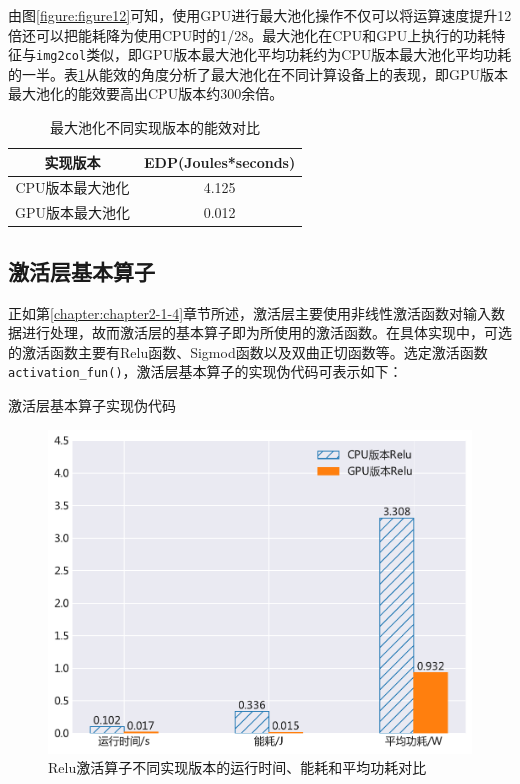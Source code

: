 由图\ref{figure:figure12}可知，使用GPU进行最大池化操作不仅可以将运算速度提升12倍还可以把能耗降为使用CPU时的1/28。最大池化在CPU和GPU上执行的功耗特征与\texttt{img2col}类似，即GPU版本最大池化平均功耗约为CPU版本最大池化平均功耗的一半。表\ref{table:table3}从能效的角度分析了最大池化在不同计算设备上的表现，即GPU版本最大池化的能效要高出CPU版本约300余倍。

\begin{table}[htbp]
  \centering
  \caption{最大池化不同实现版本的能效对比}
  \label{table:table3}
  \begin{tabular}{cc}
    \toprule
      实现版本 & EDP(Joules*seconds) \\
    \midrule
      CPU版本最大池化 & 4.125 \\
      GPU版本最大池化 & 0.012 \\
    \bottomrule
  \end{tabular}
\end{table}


\subsection{激活层基本算子}

正如第\ref{chapter:chapter2-1-4}章节所述，激活层主要使用非线性激活函数对输入数据进行处理，故而激活层的基本算子即为所使用的激活函数。在具体实现中，可选的激活函数主要有Relu函数、Sigmod函数以及双曲正切函数等。选定激活函数\texttt{activation\_fun()}，激活层基本算子的实现伪代码可表示如下：

\begin{algorithm}[htbp]
  \small
  \SetAlgoLined
  \caption{激活层基本算子实现伪代码}
  \label{algo:algorithm6}
\end{algorithm}

\begin{figure}[htb]
    \begin{center}
    \includegraphics[height=0.4\textwidth]{figures/relu_energy.pdf}
    \end{center}
    \caption{Relu激活算子不同实现版本的运行时间、能耗和平均功耗对比}\label{figure:figure13}
\end{figure}

